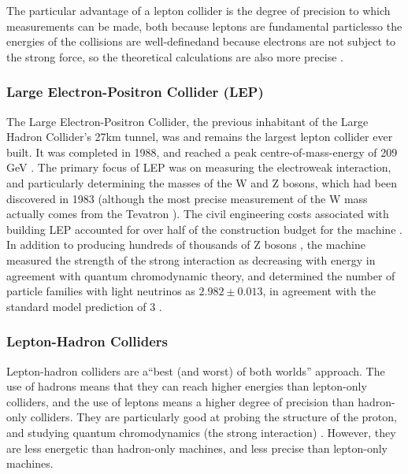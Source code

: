 The particular advantage of a lepton collider is the degree of precision to which measurements can be made, both because leptons are fundamental particles\textemdash so the energies of the collisions are well-defined\textemdash and because electrons are not subject to the strong force, so the theoretical calculations are also more precise \cite{Thorne:Interview}.

\subsubsection{Large Electron-Positron Collider (LEP)}
The Large Electron-Positron Collider, the previous inhabitant of the Large Hadron Collider's 27km tunnel, was and remains the largest lepton collider ever built. It was completed in 1988, and reached a peak centre-of-mass-energy of 209 GeV \cite{CERN:LEP:Online}. The primary focus of LEP was on measuring the electroweak interaction, and particularly determining the masses of the W and Z bosons, which had been discovered in 1983 (although the most precise measurement of the W mass actually comes from the Tevatron \cite{Butterworth:Interview}). The civil engineering costs associated with building LEP accounted for over half of the construction budget for the machine \cite{LEP:History:Online}. In addition to producing hundreds of thousands of Z bosons \cite{LEP:History:Online}, the machine measured the strength of the strong interaction as decreasing with energy in agreement with quantum chromodynamic theory, and determined the number of particle families with light neutrinos as $2.982\pm 0.013$, in agreement with the standard model prediction of 3 \cite{ALEPH:Physics:Online}.

\subsubsection{Lepton-Hadron Colliders}
Lepton-hadron colliders are a``best (and worst) of both worlds'' approach. The use of hadrons means that they can reach higher energies than lepton-only colliders, and the use of leptons means a higher degree of precision than hadron-only colliders. They are particularly good at probing the structure of the proton, and studying quantum chromodynamics (the strong interaction) \cite{Waters:Interview,Thorne:Interview,Butterworth:Interview}. However, they are less energetic than hadron-only machines, and less precise than lepton-only machines.

